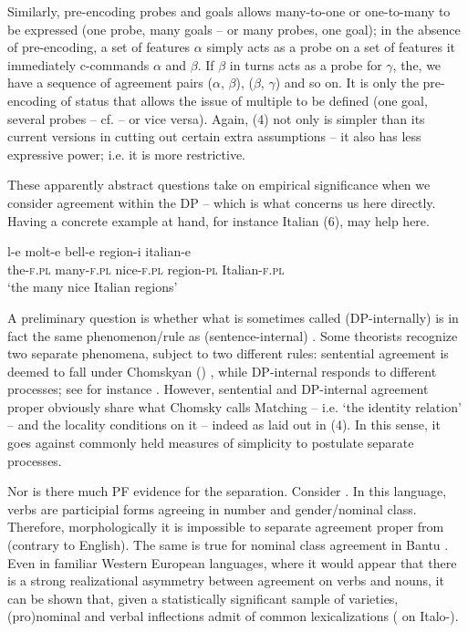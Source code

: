 \documentclass[output=paper]{langsci/langscibook}
\begin{document}
Similarly, pre-encoding probes and goals allows many-to-one or one-to-many  to be expressed (one probe, many goals – or many probes, one goal); in the absence of pre-encoding, a set of features $\alpha $ simply acts as a probe on a set of features it immediately c-commands $\alpha $ and $\beta $. If $\beta $ in turns acts as a probe for $\gamma $, the, we have a sequence of agreement pairs ($\alpha $, $\beta $), ($\beta $, $\gamma $) and so on. It is only the pre-encoding of  status that allows the issue of multiple  to be defined (one goal, several probes – cf. \citealt{Carstens2001} – or vice versa). Again, (4) not only is simpler than its current versions in cutting out certain extra assumptions – it also has less expressive power; i.e. it is more restrictive.

These apparently abstract questions take on empirical significance when we consider agreement within the DP – which is what concerns us here directly. Having a concrete example at hand, for instance Italian (6), may help here. 

\ea%
    \label{ex:manzini:6}
    \gll l-e    molt-e   bell-e    region-i  italian-e\\
         the-\textsc{f.pl}   many-\textsc{f.pl}   nice-\textsc{f.pl}   region-\textsc{pl}    Italian-\textsc{f.pl} \\
    \glt ‘the many nice Italian regions’
\z

A preliminary question is whether what is sometimes called  (DP-internally) is in fact the same phenomenon\slash rule as (sentence-internal) . Some theorists recognize two separate phenomena, subject to two different rules: sentential agreement is deemed to fall under Chomskyan () , while DP-internal  responds to different processes; see for instance \citet{Giusti2008}. However, sentential and DP-internal agreement proper obviously share what Chomsky calls Matching – i.e. ‘the identity relation’ – and the locality conditions on it – indeed as laid out in (4). In this sense, it goes against commonly held measures of simplicity to postulate separate processes. 

Nor is there much PF evidence for the separation. Consider . In this language, verbs are participial forms agreeing in number and gender\slash nominal class. Therefore, morphologically it is impossible to separate agreement proper from  (contrary to English). The same is true for nominal class agreement in Bantu \citep{Baker2008}. Even in familiar Western European languages, where it would appear that there is a strong realizational asymmetry between agreement on verbs and nouns, it can be shown that, given a statistically significant sample of varieties, (pro)nominal and verbal inflections admit of common lexicalizations (\citealt{Manzini2007} on Italo-).
\end{document}
